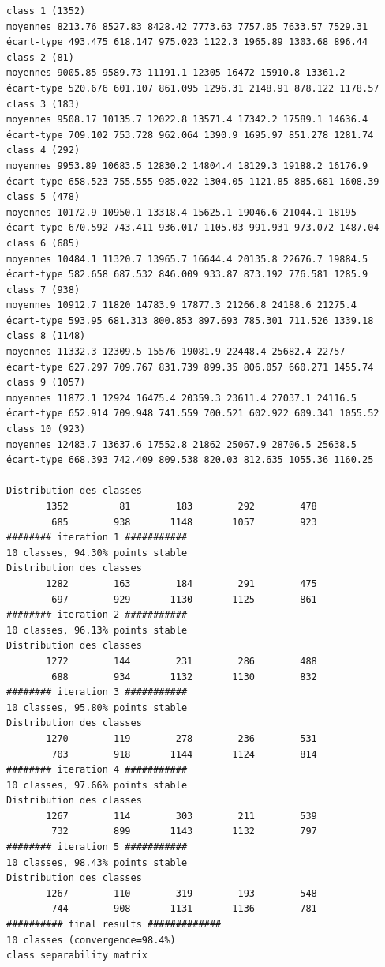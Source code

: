 \documentclass[environments,article,submit,pdftex,moreauthors]{Definitions/mdpi}
\begin{document}
\begin{scriptsize}
\begin{verbatim}
class 1 (1352)
moyennes 8213.76 8527.83 8428.42 7773.63 7757.05 7633.57 7529.31
écart-type 493.475 618.147 975.023 1122.3 1965.89 1303.68 896.44
class 2 (81)
moyennes 9005.85 9589.73 11191.1 12305 16472 15910.8 13361.2
écart-type 520.676 601.107 861.095 1296.31 2148.91 878.122 1178.57
class 3 (183)
moyennes 9508.17 10135.7 12022.8 13571.4 17342.2 17589.1 14636.4
écart-type 709.102 753.728 962.064 1390.9 1695.97 851.278 1281.74
class 4 (292)
moyennes 9953.89 10683.5 12830.2 14804.4 18129.3 19188.2 16176.9
écart-type 658.523 755.555 985.022 1304.05 1121.85 885.681 1608.39
class 5 (478)
moyennes 10172.9 10950.1 13318.4 15625.1 19046.6 21044.1 18195
écart-type 670.592 743.411 936.017 1105.03 991.931 973.072 1487.04
class 6 (685)
moyennes 10484.1 11320.7 13965.7 16644.4 20135.8 22676.7 19884.5
écart-type 582.658 687.532 846.009 933.87 873.192 776.581 1285.9
class 7 (938)
moyennes 10912.7 11820 14783.9 17877.3 21266.8 24188.6 21275.4
écart-type 593.95 681.313 800.853 897.693 785.301 711.526 1339.18
class 8 (1148)
moyennes 11332.3 12309.5 15576 19081.9 22448.4 25682.4 22757
écart-type 627.297 709.767 831.739 899.35 806.057 660.271 1455.74
class 9 (1057)
moyennes 11872.1 12924 16475.4 20359.3 23611.4 27037.1 24116.5
écart-type 652.914 709.948 741.559 700.521 602.922 609.341 1055.52
class 10 (923)
moyennes 12483.7 13637.6 17552.8 21862 25067.9 28706.5 25638.5
écart-type 668.393 742.409 809.538 820.03 812.635 1055.36 1160.25

Distribution des classes
       1352         81        183        292        478
        685        938       1148       1057        923
######## iteration 1 ###########
10 classes, 94.30% points stable
Distribution des classes
       1282        163        184        291        475
        697        929       1130       1125        861
######## iteration 2 ###########
10 classes, 96.13% points stable
Distribution des classes
       1272        144        231        286        488
        688        934       1132       1130        832
######## iteration 3 ###########
10 classes, 95.80% points stable
Distribution des classes
       1270        119        278        236        531
        703        918       1144       1124        814
######## iteration 4 ###########
10 classes, 97.66% points stable
Distribution des classes
       1267        114        303        211        539
        732        899       1143       1132        797
######## iteration 5 ###########
10 classes, 98.43% points stable
Distribution des classes
       1267        110        319        193        548
        744        908       1131       1136        781
########## final results #############
10 classes (convergence=98.4%)
class separability matrix


\end{verbatim}
\end{scriptsize}
\end{document}
